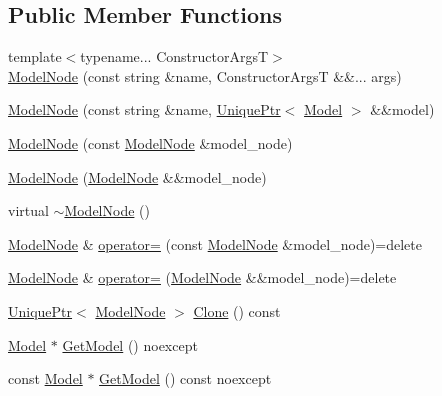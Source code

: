 \subsection*{Public Member Functions}
\begin{DoxyCompactItemize}
\item 
{\footnotesize template$<$typename... Constructor\+ArgsT$>$ }\\\hyperlink{classmage_1_1_model_node_ab8d77a4792224d8909fb399393b8294f}{Model\+Node} (const string \&name, Constructor\+ArgsT \&\&... args)
\item 
\hyperlink{classmage_1_1_model_node_a15d6a41cc5cdc90310313147100c1d6f}{Model\+Node} (const string \&name, \hyperlink{namespacemage_a8c307fbcc33bce9b7f2aa4c26c3b95cf}{Unique\+Ptr}$<$ \hyperlink{classmage_1_1_model}{Model} $>$ \&\&model)
\item 
\hyperlink{classmage_1_1_model_node_a409c098ddecf20d1b393d43c15d16482}{Model\+Node} (const \hyperlink{classmage_1_1_model_node}{Model\+Node} \&model\+\_\+node)
\item 
\hyperlink{classmage_1_1_model_node_a19ba577112ea488f227ea31642fb2cb2}{Model\+Node} (\hyperlink{classmage_1_1_model_node}{Model\+Node} \&\&model\+\_\+node)
\item 
virtual \hyperlink{classmage_1_1_model_node_a131c0062a1bed3d29fade27e602bec44}{$\sim$\+Model\+Node} ()
\item 
\hyperlink{classmage_1_1_model_node}{Model\+Node} \& \hyperlink{classmage_1_1_model_node_ad8378279b79930dfe98d176dbc1c5db9}{operator=} (const \hyperlink{classmage_1_1_model_node}{Model\+Node} \&model\+\_\+node)=delete
\item 
\hyperlink{classmage_1_1_model_node}{Model\+Node} \& \hyperlink{classmage_1_1_model_node_ad39321f4d392aa4e28169b8d7a08af68}{operator=} (\hyperlink{classmage_1_1_model_node}{Model\+Node} \&\&model\+\_\+node)=delete
\item 
\hyperlink{namespacemage_a8c307fbcc33bce9b7f2aa4c26c3b95cf}{Unique\+Ptr}$<$ \hyperlink{classmage_1_1_model_node}{Model\+Node} $>$ \hyperlink{classmage_1_1_model_node_a766f90e1d626c455ba552a3ded08b948}{Clone} () const
\item 
\hyperlink{classmage_1_1_model}{Model} $\ast$ \hyperlink{classmage_1_1_model_node_a8964223fd592fd23949d6f996c40a482}{Get\+Model} () noexcept
\item 
const \hyperlink{classmage_1_1_model}{Model} $\ast$ \hyperlink{classmage_1_1_model_node_ad8c4978c4d14ed015fdb517ba86ebd93}{Get\+Model} () const noexcept
\end{DoxyCompactItemize}

